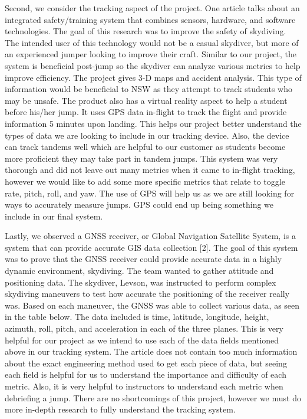\documentclass[10pt]{article}
\begin{document}
Second, we consider the tracking aspect of the project. One article talks about an integrated safety/training system that combines sensors, hardware, and software technologies. The goal of this research was to improve the safety of skydiving. The intended user of this technology would not be a casual skydiver, but more of an experienced jumper looking to improve their craft. Similar to our project, the system is beneficial post-jump so the skydiver can analyze various metrics to help improve efficiency. The project gives 3-D maps and accident analysis. This type of information would be beneficial to NSW as they attempt to track students who may be unsafe. The product also has a virtual reality aspect to help a student before his/her jump. It uses GPS data in-flight to track the flight and provide information 5 minutes upon landing. This helps our project better understand the types of data we are looking to include in our tracking device. Also, the device can track tandems well which are helpful to our customer as students become more proficient they may take part in tandem jumps. This system was very thorough and did not leave out many metrics when it came to in-flight tracking, however we would like to add some more specific metrics that relate to toggle rate, pitch, roll, and yaw. The use of GPS will help us as we are still looking for ways to accurately measure jumps. GPS could end up being something we include in our final system.

Lastly, we observed a GNSS receiver, or Global Navigation Satellite System, is a system that can provide accurate GIS data collection [2]. The goal of this system was to prove that the GNSS receiver could provide accurate data in a highly dynamic environment, skydiving. The team wanted to gather attitude and positioning data. The skydiver, Levson, was instructed to perform complex skydiving maneuvers to test how accurate the positioning of the receiver really was. Based on each maneuver, the GNSS was able to collect various data, as seen in the table below. The data included is time, latitude, longitude, height, azimuth, roll, pitch, and acceleration in each of the three planes. This is very helpful for our project as we intend to use each of the data fields mentioned above in our tracking system. The article does not contain too much information about the exact engineering method used to get each piece of data, but seeing each field is helpful for us to understand the importance and difficulty of each metric. Also, it is very helpful to instructors to understand each metric when debriefing a jump. There are no shortcomings of this project, however we must do more in-depth research to fully understand the tracking system.
\end{document}
